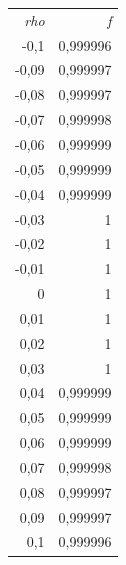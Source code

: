 \begin{tabular}{rr}

       \textit{rho} &          \textit{f} \\

      -0,1 &   0,999996 \\

     -0,09 &   0,999997 \\

     -0,08 &   0,999997 \\

     -0,07 &   0,999998 \\

     -0,06 &   0,999999 \\

     -0,05 &   0,999999 \\

     -0,04 &   0,999999 \\

     -0,03 &          1 \\

     -0,02 &          1 \\

     -0,01 &          1 \\

         0 &          1 \\

      0,01 &          1 \\

      0,02 &          1 \\

      0,03 &          1 \\

      0,04 &   0,999999 \\

      0,05 &   0,999999 \\

      0,06 &   0,999999 \\

      0,07 &   0,999998 \\

      0,08 &   0,999997 \\

      0,09 &   0,999997 \\

       0,1 &   0,999996 \\

\end{tabular}  

